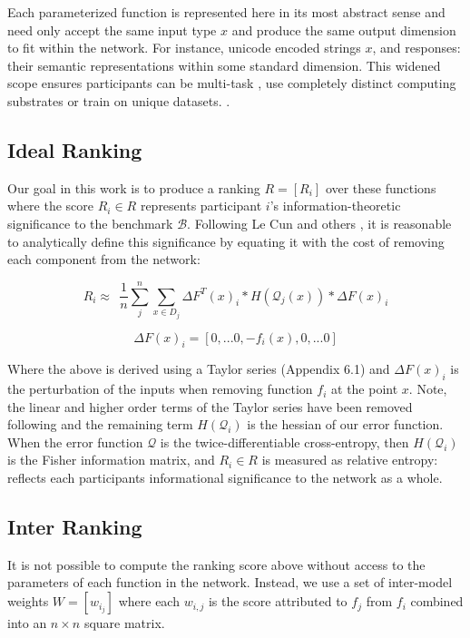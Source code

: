 \documentclass{article}
\begin{document}
Each parameterized function is represented here in its most abstract sense\cite{hinton2015distilling} and need only accept the same input type $x$ and produce the same output dimension to fit within the network. For instance, unicode encoded strings $x$, and responses: their semantic representations within some standard dimension. This widened scope ensures participants can be multi-task \cite{kaiser2017model}, use completely distinct computing substrates \cite{alex2014cortical} or train on unique datasets. \cite{lample2019crosslingual}. 

\subsection{Ideal Ranking}

Our goal in this work is to produce a ranking $R = [R_i]$ over these functions where the score $R_i \in R$ represents participant $i$'s information-theoretic significance to the benchmark $\mathcal{B}$. Following Le Cun and others \cite{lecun1989optimalbraindamage,yu2017nisp}, it is reasonable to analytically define this significance by equating it with the cost of removing each component from the network:
\bigskip

\begin{equation}
R_i \approx \ \ \frac{1}{n} \sum_{j}^{n} \sum_{x \in D_j} \Delta F^T(x)_i * H(\mathcal{Q}_j(x)) * \Delta F(x)_i 
\end{equation}

\[ \Delta F (x)_i = [0, ... 0, -f_i(x), 0, ... 0] \]

Where the above is derived using a Taylor series (Appendix 6.1) and $\Delta F (x)_i$ is the perturbation of the inputs when removing function $f_i$ at the point $x$. Note, the linear and higher order terms of the Taylor series have been removed following \cite{yu2017nisp} and the remaining term $H(\mathcal{Q}_i)$ is the hessian of our error function. When the error function $\mathcal{Q}$ is the twice-differentiable cross-entropy, then $H(\mathcal{Q}_i)$ is the Fisher information matrix, and $R_i \in R$ is measured as relative entropy: reflects each participants informational significance to the network as a whole.
\bigskip

\subsection{Inter Ranking}

It is not possible to compute the ranking score above without access to the parameters of each function in the network. Instead, we use a set of inter-model weights $W = [w_{i_j}]$ where each $w_{i,j}$ is the score attributed to $f_j$ from $f_i$ combined into an $n \times n$ square matrix.
\bigskip
\end{document}
